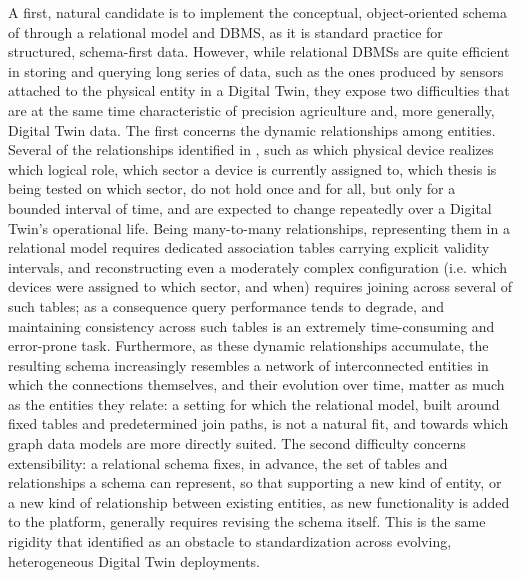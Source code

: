 A first, natural candidate is to implement the conceptual, object-oriented schema of  through a relational model and DBMS, as it is standard practice for structured, schema-first data. However, while relational DBMSs are quite efficient in storing and querying long series of data, such as the ones produced by sensors attached to the physical entity in a Digital Twin, they expose two difficulties that are at the same time characteristic of precision agriculture and, more generally, Digital Twin data. The first concerns the dynamic relationships among entities. Several of the relationships identified in , such as which physical device realizes which logical role, which sector a device is currently assigned to, which thesis is being tested on which sector, do not hold once and for all, but only for a bounded interval of time, and are expected to change repeatedly over a Digital Twin's operational life. Being many-to-many relationships, representing them in a relational model requires dedicated association tables carrying explicit validity intervals, and reconstructing even a moderately complex configuration (i.e. which devices were assigned to which sector, and when) requires joining across several of such tables; as a consequence query performance tends to degrade, and maintaining consistency across such tables is an extremely time-consuming and error-prone task. Furthermore, as these dynamic relationships accumulate, the resulting schema increasingly resembles a network of interconnected entities in which the connections themselves, and their evolution over time, matter as much as the entities they relate: a setting for which the relational model, built around fixed tables and predetermined join paths, is not a natural fit, and towards which graph data models are more directly suited. The second difficulty concerns extensibility: a relational schema fixes, in advance, the set of tables and relationships a schema can represent, so that supporting a new kind of entity, or a new kind of relationship between existing entities, as new functionality is added to the platform, generally requires revising the schema itself. This is the same rigidity that  identified as an obstacle to standardization across evolving, heterogeneous Digital Twin deployments.

